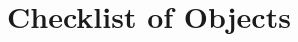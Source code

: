 \documentclass[oneside]{book}
\begin{document}





\onecolumn

\chapter{Checklist of Objects}
\setlength{\marginparwidth}{0.1in}
\setlength{\marginparsep}{0in}
\setlength{\leftmargin}{-0.5in}
\end{document}
